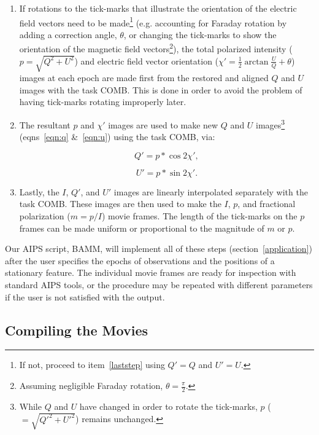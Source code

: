 \documentclass[twoside]{article}
\begin{document}
\begin{enumerate}

\item
If rotations to the tick-marks that illustrate the orientation of the
electric field vectors need to be made\footnote{If not, proceed to
item~\ref{laststep} using $Q'=Q$ and $U'=U$.} (e.g. accounting for Faraday
rotation by adding a correction angle, $\theta$, or changing the
tick-marks to show the orientation of the magnetic field
vectors\footnote{Assuming negligible Faraday rotation,
$\theta=\frac{\pi}{2}$.}), the total polarized intensity
($p=\sqrt{Q^{2}+U^{2}}$)  and electric field vector orientation
($\chi'=\frac{1}{2}\arctan{\frac{U}{Q}} + \theta$) images at each epoch
are made first from the restored and aligned $Q$ and $U$ images with the
task COMB. This is done in order to avoid the problem of having tick-marks
rotating improperly later.

\item
The resultant $p$ and $\chi'$ images are used to make new $Q$ and $U$
images\footnote{While $Q$ and $U$ have changed in order to rotate the
tick-marks, $p$ ($=\sqrt{Q'^{2}+U'^{2}}$) remains unchanged.}
(eqns~\ref{eqn:q} \&~\ref{eqn:u})  using the task COMB, via:

\begin{equation}
\label{eqn:q}
Q'=p*\cos{2\chi'},
\end{equation}

\begin{equation}
\label{eqn:u}
U'=p*\sin{2\chi'}.
\end{equation}

\item
\label{laststep}
Lastly, the $I$, $Q'$, and $U'$ images are linearly interpolated
separately with the task COMB. These images are then used to make the $I$,
$p$, and fractional polarization ($m=p/I$)  movie frames.  The length of
the tick-marks on the $p$ frames can be made uniform or proportional to
the magnitude of $m$ or $p$.


\end{enumerate}

\noindent
Our AIPS script, BAMM, will implement all of these steps
(section~\ref{application}) after the user specifies the epochs of
observations and the positions of a stationary feature. The individual
movie frames are ready for inspection with standard AIPS tools, or
the procedure may be repeated with different parameters if the user is not
satisfied with the output.


\subsection{Compiling the Movies}
\label{compile}
\end{document}
